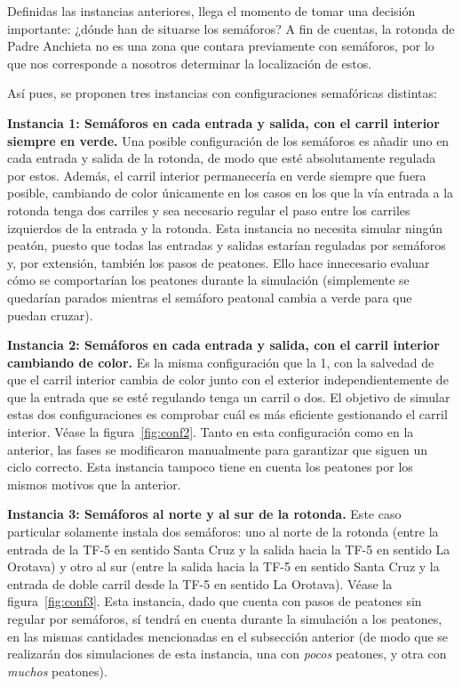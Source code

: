 Definidas las instancias anteriores, llega el momento de tomar una decisión importante: ¿dónde han de situarse los semáforos? A fin de cuentas, la rotonda de Padre Anchieta no es una zona que contara previamente con semáforos, por lo que nos corresponde a nosotros determinar la localización de estos.

Así pues, se proponen tres instancias con configuraciones semafóricas distintas:

\textbf{Instancia 1: Semáforos en cada entrada y salida, con el carril interior siempre en verde.} Una posible configuración de los semáforos es añadir uno en cada entrada y salida de la rotonda, de modo que esté absolutamente regulada por estos. Además, el carril interior permanecería en verde siempre que fuera posible, cambiando de color únicamente en los casos en los que la vía entrada a la rotonda tenga dos carriles y sea necesario regular el paso entre los carriles izquierdos de la entrada y la rotonda. Esta instancia no necesita simular ningún peatón, puesto que todas las entradas y salidas estarían reguladas por semáforos y, por extensión, también los pasos de peatones. Ello hace innecesario evaluar cómo se comportarían los peatones durante la simulación (simplemente se quedarían parados mientras el semáforo peatonal cambia a verde para que puedan cruzar).

\textbf{Instancia 2: Semáforos en cada entrada y salida, con el carril interior cambiando de color.} Es la misma configuración que la 1, con la salvedad de que el carril interior cambia de color junto con el exterior independientemente de que la entrada que se esté regulando tenga un carril o dos. El objetivo de simular estas dos configuraciones es comprobar cuál es más eficiente gestionando el carril interior. Véase la figura~\ref{fig:conf2}. Tanto en esta configuración como en la anterior, las fases se modificaron manualmente para garantizar que siguen un ciclo correcto. Esta instancia tampoco tiene en cuenta los peatones por los mismos motivos que la anterior.

\textbf{Instancia 3: Semáforos al norte y al sur de la rotonda.} Este caso particular solamente instala dos semáforos: uno al norte de la rotonda (entre la entrada de la TF-5 en sentido Santa Cruz y la salida hacia la TF-5 en sentido La Orotava) y otro al sur (entre la salida hacia la TF-5 en sentido Santa Cruz y la entrada de doble carril desde la TF-5 en sentido La Orotava). Véase la figura~\ref{fig:conf3}. Esta instancia, dado que cuenta con pasos de peatones sin regular por semáforos, sí tendrá en cuenta durante la simulación a los peatones, en las mismas cantidades mencionadas en el subsección anterior (de modo que se realizarán dos simulaciones de esta instancia, una con \textit{pocos} peatones, y otra con \textit{muchos} peatones).


